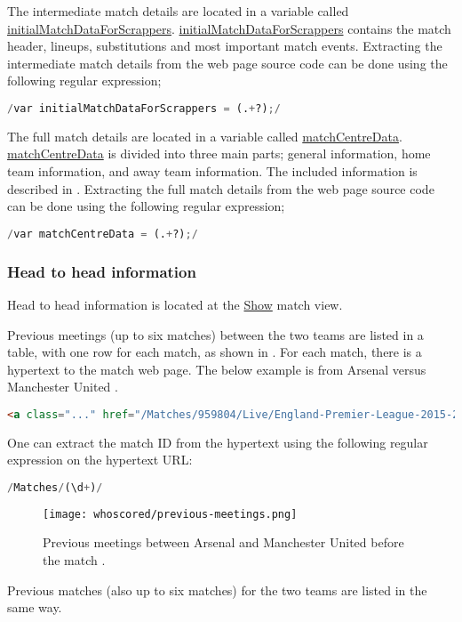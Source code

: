 The intermediate match details are located in a variable called \url{initialMatchDataForScrappers}. \url{initialMatchDataForScrappers} contains the match header, lineups, substitutions and most important match events. Extracting the intermediate match details from the web page source code can be done using the following regular expression;
\begin{lstlisting}[language=Python]
    /var initialMatchDataForScrappers = (.+?);/
\end{lstlisting}

The full match details are located in a variable called \url{matchCentreData}. \url{matchCentreData} is divided into three main parts; general information, home team information, and away team information. The included information is described in . Extracting the full match details from the web page source code can be done using the following regular expression;
\begin{lstlisting}[language=Python]
    /var matchCentreData = (.+?);/
\end{lstlisting}


\subsubsection{Head to head information}

Head to head information is located at the \url{Show} match view.

Previous meetings (up to six matches) between the two teams are listed in a table, with one row for each match, as shown in . For each match, there is a hypertext to the match web page. The below example is from Arsenal versus Manchester United .
\begin{lstlisting}[language=HTML]
    <a class="..." href="/Matches/959804/Live/England-Premier-League-2015-2016-Arsenal-Manchester-United">3 : 0</a>
\end{lstlisting}
One can extract the match ID from the hypertext using the following regular expression on the hypertext URL:
\begin{lstlisting}[language=Python]
    /Matches/(\d+)/
\end{lstlisting}
\begin{figure}[H]
    \centering
    \texttt{[image: whoscored/previous-meetings.png]}
    \caption{Previous meetings between Arsenal and Manchester United before the match .}
    \label{fig:whoscored-previous-meetings}
\end{figure}
Previous matches (also up to six matches) for the two teams are listed in the same way.

